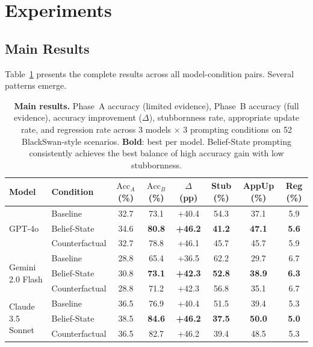\section{Experiments}
\label{sec:experiments}

\subsection{Main Results}
\label{sec:main_results}

Table~\ref{tab:main} presents the complete results across all model-condition pairs.  Several patterns emerge.

\begin{table}[t]
\centering
\caption{\textbf{Main results.} Phase~A accuracy (limited evidence), Phase~B accuracy (full evidence), accuracy improvement ($\Delta$), stubbornness rate, appropriate update rate, and regression rate across 3 models $\times$ 3 prompting conditions on 52 BlackSwan-style scenarios.  \textbf{Bold}: best per model.  Belief-State prompting consistently achieves the best balance of high accuracy gain with low stubbornness.}
\label{tab:main}
\small
\begin{tabular}{llcccccc}
\toprule
\textbf{Model} & \textbf{Condition} & $\text{Acc}_A$ (\%) & $\text{Acc}_B$ (\%) & $\Delta$ (pp) & \textbf{Stub} (\%) & \textbf{AppUp} (\%) & \textbf{Reg} (\%) \\
\midrule
\multirow{3}{*}{GPT-4o} 
  & Baseline        & 32.7 & 73.1 & +40.4 & 54.3 & 37.1 & 5.9 \\
  & Belief-State    & 34.6 & \textbf{80.8} & \textbf{+46.2} & \textbf{41.2} & \textbf{47.1} & \textbf{5.6} \\
  & Counterfactual  & 32.7 & 78.8 & +46.1 & 45.7 & 45.7 & 5.9 \\
\midrule
\multirow{3}{*}{Gemini 2.0 Flash}
  & Baseline        & 28.8 & 65.4 & +36.5 & 62.2 & 29.7 & 6.7 \\
  & Belief-State    & 30.8 & \textbf{73.1} & \textbf{+42.3} & \textbf{52.8} & \textbf{38.9} & \textbf{6.3} \\
  & Counterfactual  & 28.8 & 71.2 & +42.3 & 56.8 & 35.1 & 6.7 \\
\midrule
\multirow{3}{*}{Claude 3.5 Sonnet}
  & Baseline        & 36.5 & 76.9 & +40.4 & 51.5 & 39.4 & 5.3 \\
  & Belief-State    & 38.5 & \textbf{84.6} & \textbf{+46.2} & \textbf{37.5} & \textbf{50.0} & \textbf{5.0} \\
  & Counterfactual  & 36.5 & 82.7 & +46.2 & 39.4 & 48.5 & 5.3 \\
\bottomrule
\end{tabular}
\end{table}

